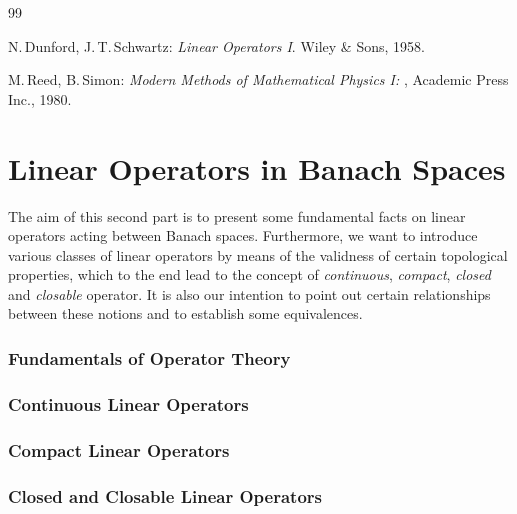\documentclass[11pt,twoside]{article}
\begin{document}
\vspace{5mm}
\begin{thebibliography}{99}
\begin{small}

 N.\,Dunford, J.\,T.\,Schwartz:
\textit{Linear Operators I}.
Wiley \& Sons, 1958.

 M.\,Reed, B.\,Simon:
\textit{Modern Methods of Mathematical Physics I: {\FA}},
Academic Press Inc., 1980.


\end{small}
\end{thebibliography}

\newpage
\thispagestyle{empty}
\part{Linear Operators in Banach Spaces}                                       %
The aim of this second part
is to present some fundamental facts on linear operators
acting between Banach spaces.
Furthermore,
we want to introduce various classes of linear operators
by means of the validness of certain topological properties,
which to the end lead to the concept of
\textit{continuous},
\textit{compact},
\textit{closed} and
\textit{closable} operator.
It is also our intention to point out certain relationships
between these notions and to establish some equivalences.

\section{Fundamentals of Operator Theory}
\section{Continuous Linear Operators}
\section{Compact Linear Operators}
\section{Closed and Closable Linear Operators}
\end{document}
